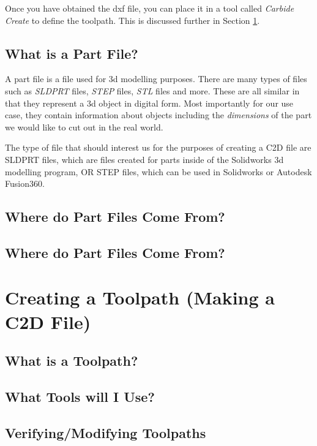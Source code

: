\documentclass{article}
\begin{document}
Once you have obtained the dxf file, you can place it in a tool called \textit{Carbide Create} to define the toolpath. This is discussed further 
in Section \ref{sec:create-toolpath}.

\subsection{What is a Part File?}
A part file is a file used for 3d modelling purposes. There are many types of files such as \textit{SLDPRT} files, \textit{STEP} files, \textit{STL} files
and more. These are all similar in that they represent a 3d object in digital form. Most importantly for our use case, they contain information about 
objects including the \textit{dimensions} of the part we would like to cut out in the real world. 

The type of file that should interest us for the purposes of creating a C2D file are SLDPRT files, which are files created for parts inside of the 
Solidworks 3d modelling program, OR STEP files, which can be used in Solidworks or Autodesk Fusion360.

\subsection{Where do Part Files Come From?}

\subsection{Where do Part Files Come From?}


\section{Creating a Toolpath (Making a C2D File)}
\label{sec:create-toolpath}

\subsection{What is a Toolpath?}

\subsection{What Tools will I Use?}

\subsection{Verifying/Modifying Toolpaths}
\label{sec:verifying-toolpath}
\end{document}
